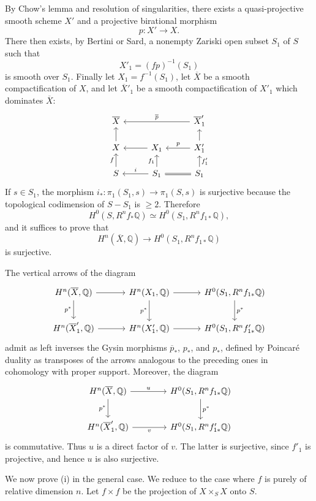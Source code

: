 \documentclass[10pt]{article}
\newcommand{\Q}{\mathbb Q}
\begin{document}
By Chow's lemma and resolution of singularities, there exists a quasi-projective smooth scheme $X'$ and a projective birational morphism
\[
p:X'\longrightarrow X.
\]
There then exists, by Bertini or Sard, a nonempty Zariski open subset $S_1$ of $S$ such that
\[
X'_1=(fp)^{-1}(S_1)
\]
is smooth over $S_1$. Finally let $X_1=f^{-1}(S_1)$, let $\overline X$ be a smooth compactification of $X$, and let $\overline X'_1$ be a smooth compactification of $X'_1$ which dominates $\overline X$:
\[
\begin{tikzcd}[row sep=1.35em,column sep=2.8em]
\overline X && \overline X'_1 \arrow[ll,"\overline p"']\\
X \arrow[u] & X_1 \arrow[l] & X'_1 \arrow[l,"p"'] \arrow[u]\\
S \arrow[u,"f"] & S_1 \arrow[l,"i"'] \arrow[u,"f_1"] & S_1 \arrow[l,equal] \arrow[u,"f'_1"']
\end{tikzcd}
\]
If $s\in S_1$, the morphism $i_*:\pi_1(S_1,s)\to\pi_1(S,s)$ is surjective because the topological codimension of $S-S_1$ is $\ge2$. Therefore
\[
H^0(S,R^nf_*\Q)\simeq H^0(S_1,R^nf_{1*}\Q),
\]
and it suffices to prove that
\[
H^n(\overline X,\Q)\longrightarrow H^0(S_1,R^nf_{1*}\Q)
\]
is surjective.

The vertical arrows of the diagram
\[
\begin{tikzcd}[column sep=3.2em,row sep=2.2em]
H^n(\overline X,\Q) \arrow[r] \arrow[d,"p^*"'] &
H^n(X_1,\Q) \arrow[r] \arrow[d,"p^*"'] &
H^0(S_1,R^nf_{1*}\Q) \arrow[d,"p^*"]\\
H^n(\overline X'_1,\Q) \arrow[r] &
H^n(X'_1,\Q) \arrow[r] &
H^0(S_1,R^nf'_{1*}\Q)
\end{tikzcd}
\]
admit as left inverses the Gysin morphisms $\overline p_*$, $p_*$, and $p_*$, defined by Poincaré duality as transposes of the arrows analogous to the preceding ones in cohomology with proper support. Moreover, the diagram
\[
\begin{tikzcd}[column sep=4em,row sep=2.2em]
H^n(\overline X,\Q) \arrow[r,"u"] \arrow[d,"p^*"'] &
H^0(S_1,R^nf_{1*}\Q) \arrow[d,"p^*"]\\
H^n(\overline X'_1,\Q) \arrow[r,"v"'] &
H^0(S_1,R^nf'_{1*}\Q)
\end{tikzcd}
\]
is commutative. Thus $u$ is a direct factor of $v$. The latter is surjective, since $f'_1$ is projective, and hence $u$ is also surjective.

We now prove (i) in the general case. We reduce to the case where $f$ is purely of relative dimension $n$. Let $f\times f$ be the projection of $X\times_SX$ onto $S$.
\end{document}
